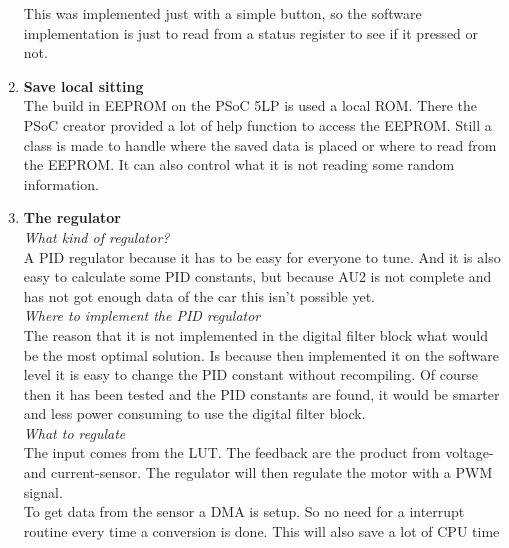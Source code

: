 \begin{enumerate}
	This was implemented just with a simple button, so the software implementation is just to read from a status register to see if it pressed or not.\\
	\item \textbf{Save local sitting}\\
	The build in EEPROM on the PSoC 5LP is used a local ROM. There the PSoC creator provided a lot of help function to access the EEPROM. Still a class is made to handle where the saved data is placed or where to read from the EEPROM. It can also control what it is not reading some random information.\\ 
	\item \textbf{The regulator}\\
	\subitem \textit{What kind of regulator?}\\
	A PID regulator because it has to be easy for everyone to tune. And it is also easy to calculate some PID constants, but because AU2 is not complete and has not got enough data of the car this isn't possible yet.\\
	\subitem \textit{Where to implement the PID regulator}\\
	The reason that it is not implemented in the digital filter block what would be the most optimal solution. Is because then implemented it on the software level it is easy to change the PID constant without recompiling. Of course then it has been tested and the PID constants are found, it would be smarter and less power consuming to use the digital filter block.\\
	\subitem \textit{What to regulate}\\
	The input comes from the LUT. The feedback are the product from voltage- and current-sensor. The regulator will then regulate the motor with a PWM signal.\\
	To get data from the sensor a DMA is setup. So no need for a interrupt routine every time a conversion is done. This will also save a lot of CPU time\\
\end{enumerate}

